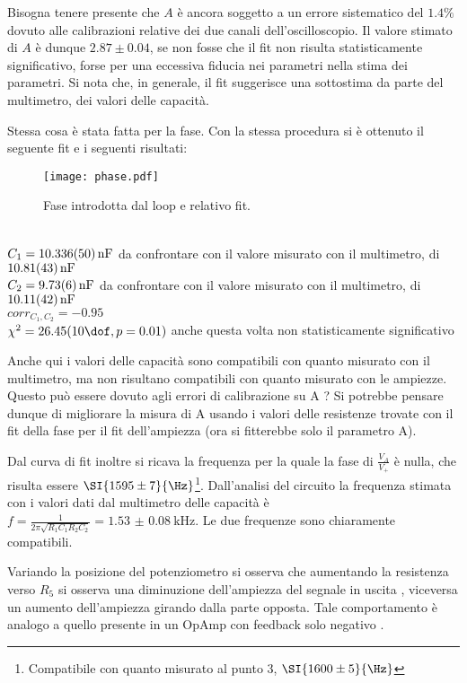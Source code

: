 Bisogna tenere presente che $A$ è ancora soggetto a un errore sistematico del $1.4 \%$ dovuto alle calibrazioni relative dei due canali dell'oscilloscopio. Il valore stimato di $A$ è dunque $2.87 \pm 0.04$, se non fosse che il fit non risulta statisticamente significativo, forse per una eccessiva fiducia nei parametri nella stima dei parametri.
Si nota che, in generale, il fit suggerisce una sottostima da parte del multimetro, dei  valori delle capacità.


Stessa cosa è stata fatta per la fase. Con la stessa procedura si è ottenuto il seguente fit e i seguenti risultati:
\begin{figure}[h]
	\centering
	\texttt{[image: phase.pdf]}
	\caption{Fase introdotta dal loop e relativo fit.}
	\label{f:lpfs}
\end{figure}
\\
$C_1=\SI{10.336 \pm 0.05}{nF}$ da confrontare con il valore misurato con il multimetro, di $\SI{10.81\pm 0.43}{nF}$\\
$C_2=\SI{9.73\pm 0.06}{nF}$ da confrontare con il valore misurato con il multimetro, di $\SI{10.11\pm 0.42}{nF}$\\
$corr_{C_1, C_2}=-0.95$\\
$\chi^2=26.45 (10 \dof, p = 0.01)$ anche questa volta non statisticamente significativo


Anche qui i valori delle capacità sono compatibili con quanto misurato con il multimetro, ma non risultano compatibili con quanto misurato con le ampiezze. Questo può essere dovuto agli errori di calibrazione su A ? Si potrebbe pensare dunque di migliorare la misura di A usando i valori delle resistenze trovate con il fit della fase per il fit dell'ampiezza (ora si fitterebbe solo il parametro A). %


Dal curva di fit inoltre si ricava la frequenza per la quale la fase di $\frac{V_A}{V_+}$ è nulla, che risulta essere $\SI{1595 \pm 7}{\Hz}$\footnote{Compatibile con quanto misurato al punto 3, $\SI{1600 \pm 5}{\Hz}$}.%
Dall'analisi del circuito la frequenza stimata con i valori dati dal multimetro delle capacità è $f=\frac{1}{2 \pi \sqrt{R_1C_1R_2C_2}}= \SI{1.53(8)}{\kHz}$. Le due frequenze sono chiaramente compatibili.


Variando la posizione del potenziometro si osserva che aumentando la resistenza verso $R_5$ si osserva una diminuzione dell'ampiezza del segnale in uscita , viceversa un aumento dell'ampiezza girando dalla parte opposta. Tale comportamento è analogo a quello presente in un OpAmp con feedback solo negativo .
